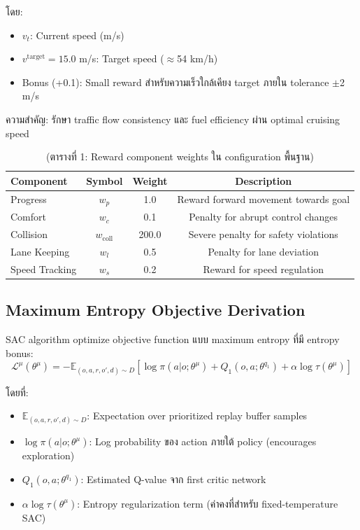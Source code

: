 \documentclass[10pt,a4paper,twocolumn]{article}
\begin{document}
โดย:
\begin{itemize}
    \item $v_t$: Current speed (m/s)
    \item $v^{\text{target}} = 15.0$ m/s: Target speed ($\approx$54 km/h)
    \item Bonus (+0.1): Small reward สำหรับความเร็วใกล้เคียง target ภายใน tolerance $\pm$2 m/s
\end{itemize}

ความสำคัญ: รักษา traffic flow consistency และ fuel efficiency ผ่าน optimal cruising speed

\begin{table}[h!]
    \centering
    \caption*{(ตารางที่ 1: Reward component weights ใน configuration พื้นฐาน)}
    \label{tab:reward-weights}
    \begin{tabular}{lccc}
        \toprule
        \textbf{Component} & \textbf{Symbol} & \textbf{Weight} & \textbf{Description} \\
        \midrule
        Progress & $w_p$ & 1.0 & Reward forward movement towards goal \\
        Comfort & $w_c$ & 0.1 & Penalty for abrupt control changes \\
        Collision & $w_{\text{coll}}$ & 200.0 & Severe penalty for safety violations \\
        Lane Keeping & $w_l$ & 0.5 & Penalty for lane deviation \\
        Speed Tracking & $w_s$ & 0.2 & Reward for speed regulation \\
        \bottomrule
    \end{tabular}
\end{table}

\subsection{Maximum Entropy Objective Derivation}

SAC algorithm optimize objective function แบบ maximum entropy ที่มี entropy bonus:
\begin{equation}\label{eq:sac-actor-objective}
    \mathcal{L}^{\mu}( \theta^{\mu}) = -\mathbb{E}_{(o,a,r,o',d)\sim D} \left[ \log \pi(a|o;\theta^{\mu}) + Q_1(o,a;\theta^{q_1}) + \alpha \log \tau(\theta^{\mu}) \right]
\end{equation}

โดยที่:
\begin{itemize}
    \item $\mathbb{E}_{(o,a,r,o',d)\sim D}$: Expectation over prioritized replay buffer samples
    \item $\log \pi(a|o;\theta^{\mu})$: Log probability ของ action ภายใต้ policy (encourages exploration)
    \item $Q_1(o,a;\theta^{q_1})$: Estimated Q-value จาก first critic network
    \item $\alpha \log \tau(\theta^{\mu})$: Entropy regularization term (ค่าคงที่สำหรับ fixed-temperature SAC)
\end{itemize}
\end{document}
